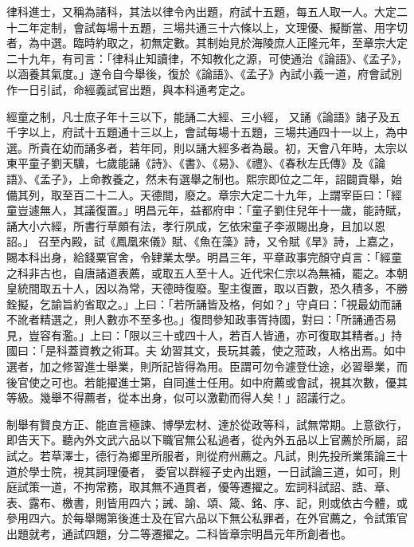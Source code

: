 \begin{pinyinscope}
 律科進士，又稱為諸科，其法以律令內出題，府試十五題，每五人取一人。大定二十二年定制，會試每場十五題，三場共通三十六條以上，文理優、擬斷當、用字切者，為中選。臨時約取之，初無定數。其制始見於海陵庶人正隆元年，至章宗大定二十九年，有司言：「律科止知讀律，不知教化之源，可使通治《論語》、《孟子》，以涵養其氣度。」遂令自今舉後，復於《論語》、《孟子》內試小義一道，府會試別作一日引試，命經義試官出題，與本科通考定之。



 經童之制，凡士庶子年十三以下，能誦二大經、三小經，
 又誦《論語》諸子及五千字以上，府試十五題通十三以上，會試每場十五題，三場共通四十一以上，為中選。所貴在幼而誦多者，若年同，則以誦大經多者為最。初，天會八年時，太宗以東平童子劉天驥，七歲能誦《詩》、《書》、《易》、《禮》、《春秋左氏傳》及《論語》、《孟子》，上命教養之，然未有選舉之制也。熙宗即位之二年，詔闢貢舉，始備其列，取至百二十二人。天德間，廢之。章宗大定二十九年，上謂宰臣曰：「經童豈遽無人，其議復置。」明昌元年，益都府申：「童子劉住兒年十一歲，能詩賦，誦大小六經，所書行草頗有法，孝行夙成，乞依宋童子李淑賜出身，且加以恩詔。」
 召至內殿，試《鳳凰來儀》賦、《魚在藻》詩，又令賦《旱》詩，上嘉之，賜本科出身，給錢粟官舍，令肄業太學。明昌三年，平章政事完顏守貞言：「經童之科非古也，自唐諸道表薦，或取五人至十人。近代宋仁宗以為無補，罷之。本朝皇統間取五十人，因以為常，天德時復廢。聖主復置，取以百數，恐久積多，不勝銓擬，乞諭旨約省取之。」上曰：「若所誦皆及格，何如？」守貞曰：「視最幼而誦不訛者精選之，則人數亦不至多也。」復問參知政事胥持國，對曰：「所誦通否易見，豈容有濫。」上曰：「限以三十或四十人，若百人皆通，亦可復取其精者。」持國曰：「是科蓋資教之術耳。夫
 幼習其文，長玩其義，使之蒞政，人格出焉。如中選者，加之修習進士舉業，則所記皆得為用。臣謂可勿令遽登仕途，必習舉業，而後官使之可也。若能擢進士第，自同進士任用。如中府薦或會試，視其次數，優其等級。幾舉不得薦者，從本出身，似可以激勸而得人矣！」詔議行之。



 制舉有賢良方正、能直言極諫、博學宏材、達於從政等科，試無常期。上意欲行，即告天下。聽內外文武六品以下職官無公私過者，從內外五品以上官薦於所屬，詔試之。若草澤士，德行為鄉里所服者，則從府州薦之。凡試，則先投所業策論三十道於學士院，視其詞理優者，
 委官以群經子史內出題，一日試論三道，如可，則庭試策一道，不拘常務，取其無不通貫者，優等遷擢之。宏詞科試詔、誥、章、表、露布、檄書，則皆用四六；誡、諭、頌、箴、銘、序、記，則或依古今體，或參用四六。於每舉賜第後進士及在官六品以下無公私罪者，在外官薦之，令試策官出題就考，通試四題，分二等遷擢之。二科皆章宗明昌元年所創者也。




\end{pinyinscope}
